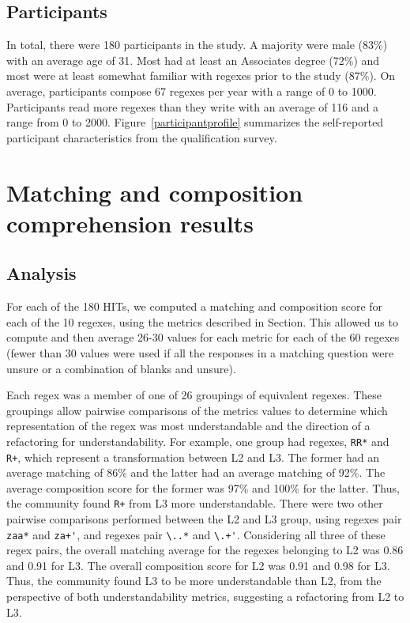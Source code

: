 \subsection{Participants}

In total, there were 180 participants in the study.
A majority were male (83\%) with an average age of 31. Most had
at least an Associates degree (72\%) and most were at least somewhat familiar with regexes prior to the study (87\%). On average,
participants compose 67 regexes per year with a range of 0 to 1000.
Participants read more regexes than they write with an average of 116 and a range from 0 to 2000.
Figure~\ref{participantprofile} summarizes the self-reported participant characteristics from the qualification survey.

\section{Matching and composition comprehension results}




\subsection{Analysis}
For each of the 180 HITs, we computed a matching and composition score for each of the 10 regexes, using the metrics described in Section. This allowed us to compute and then average 26-30 values for each metric  for each of the 60 regexes (fewer than 30 values were used if all the responses in a matching question were unsure or a combination of blanks and unsure).

Each regex was a member of one of 26 groupings of equivalent regexes.
These groupings allow pairwise comparisons of the metrics values to determine which representation of the regex was most understandable and the direction of a refactoring for understandability.
For example, one group had regexes, \verb!RR*! and \verb!R+!, which  represent a transformation between L2 and L3. The former had an average matching of 86\% and the latter had an average matching of 92\%. The average composition score for the former was 97\% and 100\% for the latter. Thus, the community found \verb!R+! from L3 more understandable.
There were two other pairwise comparisons performed between the L2 and L3 group, using regexes pair \verb!zaa*! and \verb!za+'!, and regexes pair \verb!\..*! and \verb!\.+'!.
Considering all three of these regex pairs, the overall matching average for the regexes belonging to L2 was 0.86 and 0.91 for L3.
The overall composition score for L2 was 0.91 and 0.98 for L3. Thus, the community found L3 to be more understandable than L2, from the perspective of both understandability metrics, suggesting a refactoring from L2 to L3.

